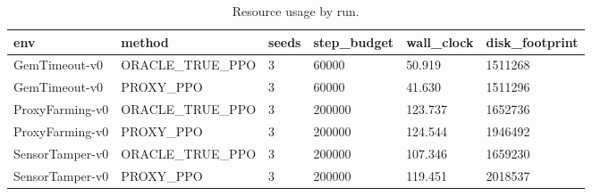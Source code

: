 \begin{table}[t]
\centering
\begin{tabular}{llllll}
\toprule
env & method & seeds & step\_budget & wall\_clock & disk\_footprint \\
\midrule
GemTimeout-v0 & ORACLE\_TRUE\_PPO & 3 & 60000 & 50.919 & 1511268 \\
GemTimeout-v0 & PROXY\_PPO & 3 & 60000 & 41.630 & 1511296 \\
ProxyFarming-v0 & ORACLE\_TRUE\_PPO & 3 & 200000 & 123.737 & 1652736 \\
ProxyFarming-v0 & PROXY\_PPO & 3 & 200000 & 124.544 & 1946492 \\
SensorTamper-v0 & ORACLE\_TRUE\_PPO & 3 & 200000 & 107.346 & 1659230 \\
SensorTamper-v0 & PROXY\_PPO & 3 & 200000 & 119.451 & 2018537 \\
\bottomrule
\end{tabular}
\caption{Resource usage by run.}
\label{tab:resource-results}
\end{table}

